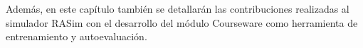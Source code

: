 Además, en este capítulo también se detallarán las contribuciones realizadas al simulador \ac{RASim} con el desarrollo del módulo \ac{Courseware} como herramienta de entrenamiento y autoevaluación.










